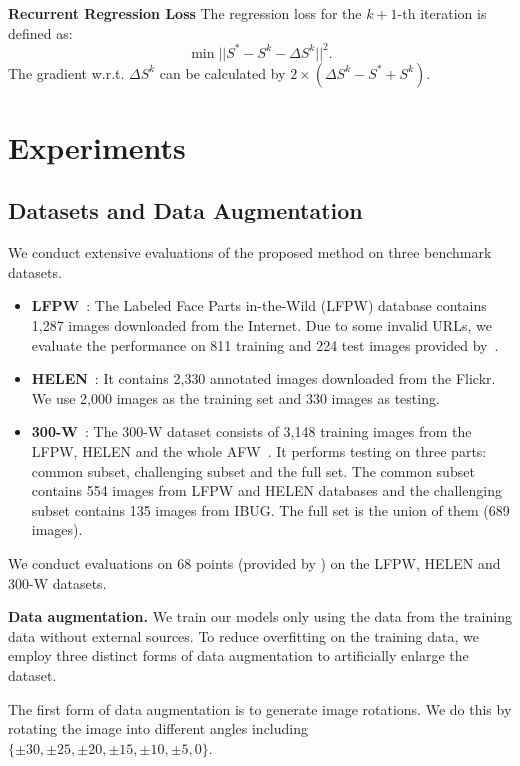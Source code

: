 \documentclass[journal]{IEEEtran}
\begin{document}
\textbf{Recurrent Regression Loss} The regression loss for the $k+1$-th iteration is defined as:
\begin{equation}
\min ||S^{*} - S^k - \Delta S^k||^2.
\label{least_squares}
\end{equation}
The gradient w.r.t. $\Delta S^k$ can be calculated by $2 \times (\Delta S^k - S^{*} + S^k)$.


\section{Experiments}
\label{experiments}

\subsection{Datasets and Data Augmentation}

We conduct extensive evaluations of the proposed method on three benchmark datasets.
\begin{itemize}
\item \textbf{LFPW}~\cite{lfpw}: The Labeled Face Parts in-the-Wild (LFPW) database contains 1,287 images downloaded from the Internet. Due to some invalid URLs, we evaluate the performance on 811 training and 224 test images provided by~\cite{300w}.

\item \textbf{HELEN}~\cite{helen}: It contains 2,330 annotated images downloaded from the Flickr. We use 2,000 images as the training set and 330 images as testing.

\item \textbf{300-W}~\cite{300w}: The 300-W dataset consists of 3,148 training images from the LFPW, HELEN and the whole AFW~\cite{zhu2012face}. It performs testing on three parts: common subset, challenging subset and the full set. The common subset contains 554 images from LFPW and HELEN databases and the challenging subset contains 135 images from IBUG. The full set is the union of them (689 images).
\end{itemize}

We conduct evaluations on 68 points (provided by \cite{300w}) on the LFPW, HELEN and 300-W  datasets.

\textbf{Data augmentation.}
We train our models only using the data from the training data without external sources. To reduce overfitting on the training data, we employ three distinct forms of data augmentation to artificially enlarge the dataset.

The first form of data augmentation is to generate image rotations. We do this by rotating the image into different angles including $\{\pm 30,\pm 25, \pm 20, \pm 15, \pm 10, \pm 5, 0\}$.
\end{document}
